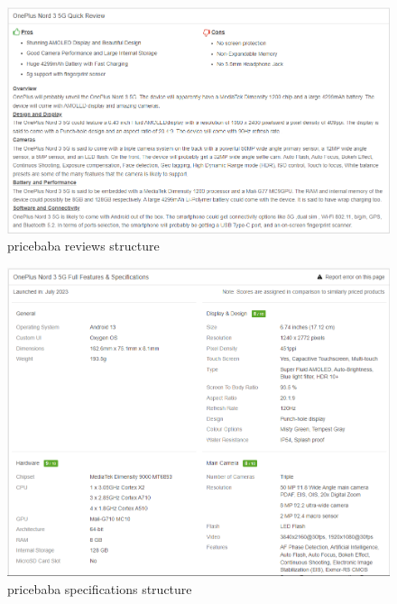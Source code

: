 \begin{figure}[H]
    \centering
    \includegraphics[width=12cm]{images/pricebaba_review_structure.png}
    \caption{pricebaba reviews structure \citep{OnePlusNord35G2023}}
    \label{fig:pricebaba-review-structure}
\end{figure}
\begin{figure}[H]
    \centering
    \includegraphics[width=12cm]{images/pricebaba_spec_structure.png}
    \caption{pricebaba specifications structure \citep{OnePlusNord35G2023}}
    \label{fig:pricebaba-spec-structure}
\end{figure}

